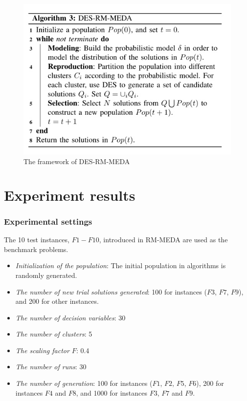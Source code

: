 \documentclass[xcolor=dvipsnames]{beamer}
\begin{document}
    \begin{frame}
    \begin{figure}
    \centering
    \includegraphics[width=0.5\columnwidth]{alg3.jpg}
    \caption{The framework of DES-RM-MEDA}
    \end{figure}
    \end{frame}
    \section{Experiment results}
    \begin{frame}
    \frametitle{Experimental settings}
    The 10 test instances, $F1-F10$, introduced in RM-MEDA are used as the benchmark problems.
    \begin{itemize}
    \item \emph{Initialization of the population}: The initial population in algorithms is randomly generated.
    \item \emph{The number of new trial solutions generated}: 100 for instances ($F3$, $F7$, $F9$), and 200 for other instances.
    \item \emph{The number of decision variables}: 30
    \item \emph{The number of clusters}: 5
    \item\emph{The scaling factor $F$}: 0.4
    \item\emph{The number of runs}: 30
    \item\emph{The number of generation}: 100 for instances ($F1$, $F2$, $F5$, $F6$), 200 for instances $F4$ and $F8$, and 1000 for instances $F3$, $F7$ and $F9$.
    \end{itemize}
    \end{frame}
\end{document}
